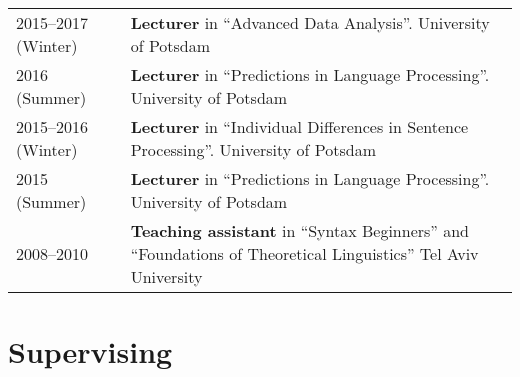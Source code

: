 \documentclass[]{article}
\begin{document}
\begin{longtable}[]{@{}ll@{}}
\toprule
\endhead
\begin{minipage}[t]{0.25\columnwidth}\raggedright
2015--2017 (Winter)\strut
\end{minipage} & \begin{minipage}[t]{0.69\columnwidth}\raggedright
\textbf{Lecturer} in ``Advanced Data Analysis''. University of
Potsdam\strut
\end{minipage}\tabularnewline
\begin{minipage}[t]{0.25\columnwidth}\raggedright
2016 (Summer)\strut
\end{minipage} & \begin{minipage}[t]{0.69\columnwidth}\raggedright
\textbf{Lecturer} in ``Predictions in Language Processing''. University
of Potsdam\strut
\end{minipage}\tabularnewline
\begin{minipage}[t]{0.25\columnwidth}\raggedright
2015--2016 (Winter)\strut
\end{minipage} & \begin{minipage}[t]{0.69\columnwidth}\raggedright
\textbf{Lecturer} in ``Individual Differences in Sentence Processing''.
University of Potsdam\strut
\end{minipage}\tabularnewline
\begin{minipage}[t]{0.25\columnwidth}\raggedright
2015 (Summer)\strut
\end{minipage} & \begin{minipage}[t]{0.69\columnwidth}\raggedright
\textbf{Lecturer} in ``Predictions in Language Processing''. University
of Potsdam\strut
\end{minipage}\tabularnewline
\begin{minipage}[t]{0.25\columnwidth}\raggedright
2008--2010\strut
\end{minipage} & \begin{minipage}[t]{0.69\columnwidth}\raggedright
\textbf{Teaching assistant} in ``Syntax Beginners'' and ``Foundations of
Theoretical Linguistics'' Tel Aviv University\strut
\end{minipage}\tabularnewline
\bottomrule
\end{longtable}

\hypertarget{supervising}{%
\section{Supervising}\label{supervising}}
\end{document}
